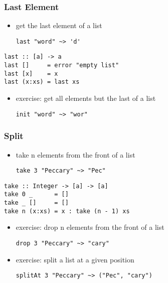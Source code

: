 \documentclass[dvipsnames]{beamer}
\theoremstyle{plain}
\begin{document}
\begin{frame}[fragile]
  \frametitle{Last Element}

  \begin{itemize}
    \item get the last element of a list
    \begin{lstlisting}[frame=none]
last "word" ~> 'd'
    \end{lstlisting}
  \end{itemize}

  \pause
  \begin{exampleblock}{}
    \begin{lstlisting}[deletekeywords={last}]
last :: [a] -> a
last []     = error "empty list"
last [x]    = x
last (x:xs) = last xs
    \end{lstlisting}
  \end{exampleblock}

  \pause
  \begin{itemize}
    \item exercise: get all elements but the last of a list
    \begin{lstlisting}[frame=none]
init "word" ~> "wor"
    \end{lstlisting}
  \end{itemize}
\end{frame}

\begin{frame}[fragile]
  \frametitle{Split}

  \begin{itemize}
    \item take n elements from the front of a list
    \begin{lstlisting}[frame=none]
take 3 "Peccary" ~> "Pec"
    \end{lstlisting}
  \end{itemize}

  \pause
  \begin{exampleblock}{}
    \begin{lstlisting}[deletekeywords={take}]
take :: Integer -> [a] -> [a]
take 0 _      = []
take _ []     = []
take n (x:xs) = x : take (n - 1) xs
    \end{lstlisting}
  \end{exampleblock}

  \pause
  \begin{itemize}
    \item exercise: drop n elements from the front of a list
    \begin{lstlisting}[frame=none]
drop 3 "Peccary" ~> "cary"
    \end{lstlisting}

    \item exercise: split a list at a given position
    \begin{lstlisting}[frame=none]
splitAt 3 "Peccary" ~> ("Pec", "cary")
    \end{lstlisting}
  \end{itemize}
\end{frame}
\end{document}
